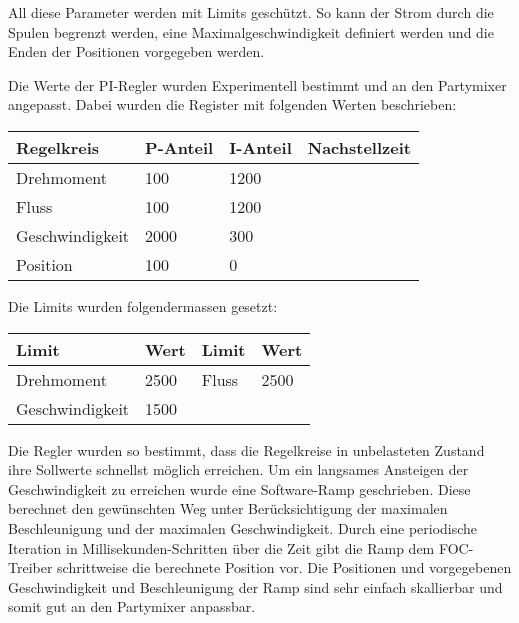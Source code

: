 All diese Parameter werden mit Limits geschützt. So kann der Strom durch die Spulen begrenzt werden, eine Maximalgeschwindigkeit definiert werden und die Enden der Positionen vorgegeben werden.

Die Werte der PI-Regler wurden Experimentell bestimmt und an den Partymixer angepasst. Dabei wurden die Register mit folgenden Werten beschrieben:

\begin{tabularx}{\linewidth}{|l|X|X|l|}
\hline
\textbf{Regelkreis} & \textbf{P-Anteil} & \textbf{I-Anteil} & \textbf{Nachstellzeit}\\
\hline
Drehmoment & 100 & 1200 & \\
\hline
Fluss & 100 & 1200 & \\
\hline
Geschwindigkeit & 2000 & 300 & \\
\hline
Position & 100 & 0 & \\
\hline
\end{tabularx}

Die Limits wurden folgendermassen gesetzt:

\begin{tabularx}{\linewidth}{|l|X||l|X|}
\hline
\textbf{Limit} & \textbf{Wert} & \textbf{Limit} & \textbf{Wert}\\
\hline
Drehmoment & 2500 & Fluss & 2500\\
\hline
Geschwindigkeit & 1500 &  & \\
\hline
\end{tabularx}

Die Regler wurden so bestimmt, dass die Regelkreise in unbelasteten Zustand ihre Sollwerte schnellst möglich erreichen. Um ein langsames Ansteigen der Geschwindigkeit zu erreichen wurde eine Software-Ramp geschrieben. Diese berechnet den gewünschten Weg unter Berücksichtigung der maximalen Beschleunigung und der maximalen Geschwindigkeit. Durch eine periodische Iteration in Millisekunden-Schritten über die Zeit gibt die Ramp dem FOC-Treiber schrittweise die berechnete Position vor. Die Positionen und vorgegebenen Geschwindigkeit und Beschleunigung der Ramp sind sehr einfach skallierbar und somit gut an den Partymixer anpassbar.

